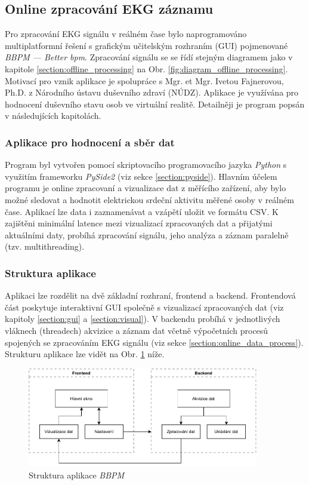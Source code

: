 \subsection{Online zpracování EKG záznamu}
\label{section:online_processing}
Pro zpracování EKG signálu v reálném čase bylo naprogramováno multiplatformní
řešení s grafickým učitelským rozhraním (GUI) pojmenované \textit{BBPM ---
Better bpm}. Zpracování signálu se se řídí stejným diagramem jako v kapitole
\ref{section:offline_processing} na Obr. \ref{fig:diagram_offline_processing}.
Motivací pro vznik aplikace je spolupráce s Mgr. et Mgr. Ivetou Fajnerovou,
Ph.D. z Národního ústavu duševního zdraví (NÚDZ). Aplikace je využívána pro
hodnocení duševního stavu osob ve virtuální realitě. Detailněji je program
popsán v následujících kapitolách.

\subsubsection{Aplikace pro hodnocení a sběr dat}
Program byl vytvořen pomocí skriptovacího programovacího jazyka \textit{Python}
\cite{python} s využitím frameworku \textit{PySide2} (viz sekce
\ref{section:pyside}). Hlavním účelem programu je online zpracovaní a
vizualizace dat z měřícího zařízení, aby bylo možné sledovat a hodnotit
elektrickou srdeční aktivitu měřené osoby v reálném čase. Aplikací lze data i
zaznamenávat a vzápětí uložit ve formátu CSV. K zajištěni minimální latence mezi
vizualizací zpracovaných dat a přijatými aktuálními daty, probíhá zpracování
signálu, jeho analýza a záznam paralelně (tzv. multithreading).

\subsubsection{Struktura aplikace}
Aplikaci lze rozdělit na dvě základní rozhraní, frontend a backend. Frontendová
část poskytuje interaktivní GUI společně s vizualizací zpracovaných dat (viz
kapitoly \ref{section:gui} a \ref{section:visual}). V backendu probíhá v
jednotlivých vláknech (threadech) akvizice a záznam dat včetně výpočetních
procesů spojených se zpracováním EKG signálu (viz sekce
\ref{section:online_data_process}). Strukturu aplikace lze vidět na Obr.
\ref{fig:app_structure} níže. 

\begin{figure}[h]
    \begin{center}
        \includegraphics[width=0.9\textwidth]{../assets/diagrams/app_structure}
        \caption{Struktura aplikace \textit{BBPM}}
        \label{fig:app_structure}
    \end{center}
\end{figure}

